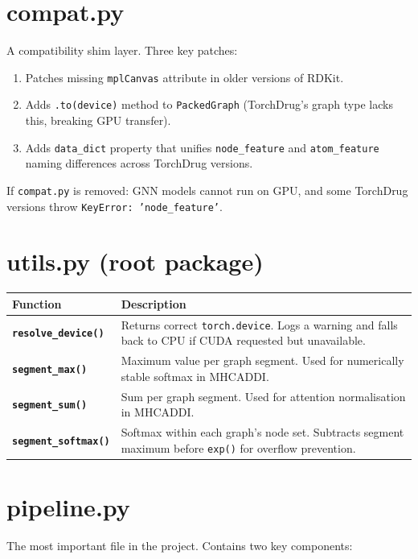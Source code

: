 \documentclass[12pt,a4paper,oneside]{book}
\begin{document}
\section{compat.py}
A compatibility shim layer. Three key patches:
\begin{enumerate}
  \item Patches missing \texttt{mplCanvas} attribute in older versions of RDKit.
  \item Adds \texttt{.to(device)} method to \texttt{PackedGraph} (TorchDrug's graph type lacks this, breaking GPU transfer).
  \item Adds \texttt{data\_dict} property that unifies \texttt{node\_feature} and \texttt{atom\_feature} naming differences across TorchDrug versions.
\end{enumerate}
\begin{tcolorbox}[warnbox]
If \texttt{compat.py} is removed: GNN models cannot run on GPU, and some TorchDrug versions throw \texttt{KeyError: 'node\_feature'}.
\end{tcolorbox}

\section{utils.py (root package)}
\begin{longtable}{>{\bfseries}p{4.5cm}p{10cm}}
\toprule
Function & Description \\
\midrule\endhead
\texttt{resolve\_device()} & Returns correct \texttt{torch.device}. Logs a warning and falls back to CPU if CUDA requested but unavailable. \\
\midrule
\texttt{segment\_max()} & Maximum value per graph segment. Used for numerically stable softmax in MHCADDI. \\
\midrule
\texttt{segment\_sum()} & Sum per graph segment. Used for attention normalisation in MHCADDI. \\
\midrule
\texttt{segment\_softmax()} & Softmax within each graph's node set. Subtracts segment maximum before \texttt{exp()} for overflow prevention. \\
\bottomrule
\end{longtable}

\section{pipeline.py}
The most important file in the project. Contains two key components:
\end{document}

